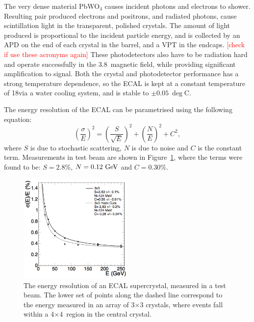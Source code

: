 The very dense material PbWO$_{4}$ causes incident photons and electrons to shower. 
Resulting pair produced electrons and positrons, and radiated photons, cause scintillation light in the transparent, polished crystals. 
The amount of light produced is proportional to the incident particle energy, and is collected by an \ac{APD} on the end of each crystal in the barrel, and a \ac{VPT} in the endcaps. \textcolor{red}{[check if use these acronyms again]}
These photodetectors also have to be radiation hard and operate successfully in the 3.8~\T magnetic field, while providing significant amplification to signal.
Both the crystal and photodetector performance has a strong temperature dependence, so the \ac{ECAL} is kept at a constant temperature of 18\deg via a water cooling system, and is stable to $\pm0.05~\deg$C.

The energy resolution of the \ac{ECAL} can be parametrised using the following equation:
\begin{equation}
\left(\frac{\sigma}{E}\right)^{2} = \left(\frac{S}{\sqrt{E}}\right)^{2} + \left(\frac{N}{E}\right)^{2} + C^{2},
\end{equation}
where $S$ is due to stochastic scattering, $N$ is due to noise and $C$ is the constant term. Measurements in test beam are shown in Figure~\ref{fig:CMSecalRes}, where the terms were found to be: $S = 2.8\%$, $N=0.12~\mathrm{GeV}$ and $C = 0.30\%$. 

\begin{figure}
  \begin{center}
  \includegraphics[width=0.5\textwidth]{Figures/detector/EcalRes.png}
  \caption{The energy resolution of an \ac{ECAL} supercrystal, measured in a test beam. The lower set of points along the dashed line correspond to the energy measured in an array of 3$\times$3 crystals, where events fall within a 4$\times$4~\mm region in the central crystal. 
}
  \label{fig:CMSecalRes}
  \end{center}
\end{figure}

